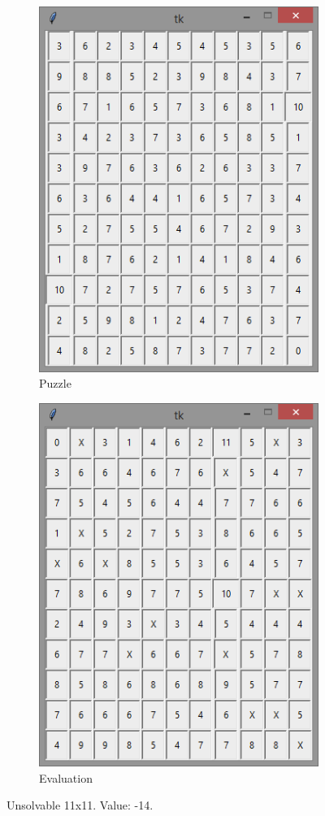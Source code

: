\documentclass[12pt]{article}
\begin{document}
\begin{figure}[H]
	\begin{subfigure}{.5\textwidth}
		\centering
     		\includegraphics[width = .6\linewidth]{11x11_1_puzzle_-14}
     		\caption{Puzzle}
     		\label{fig9:sfig1}
	\end{subfigure}
	\begin{subfigure}{.5\textwidth}
		\centering
		\includegraphics[width = .6\linewidth]{11x11_1_eval_-14}
		\caption{Evaluation}
		\label{fig9:sfig2}
	\end{subfigure}
\caption{Unsolvable 11x11. Value: -14.}
\label{fig:11x11bad}
\end{figure}
\end{document}
